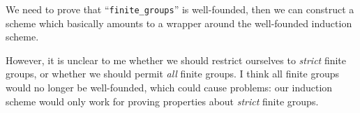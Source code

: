 We need to prove that ``\lstinline{finite_groups}'' is well-founded,
then we can construct a scheme which basically amounts to a wrapper
around the well-founded induction scheme.

However, it is unclear to me whether we should restrict ourselves to
\emph{strict} finite groups, or whether we should permit \emph{all}
finite groups. I think all finite groups would no longer be
well-founded, which could cause problems: our induction scheme would
only work for proving properties about \emph{strict} finite groups.